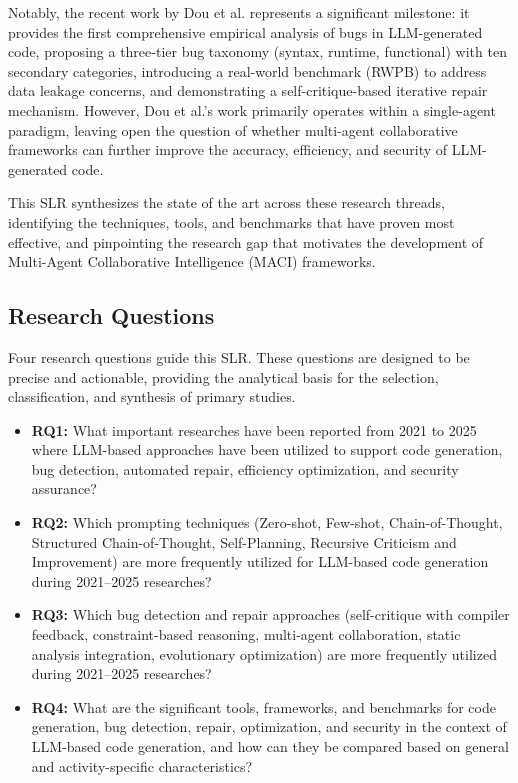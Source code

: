 \documentclass[11pt,a4paper]{article}
\begin{document}
Notably, the recent work by Dou et al. \cite{dou2026} represents a significant milestone: it provides the first comprehensive empirical analysis of bugs in LLM-generated code, proposing a three-tier bug taxonomy (syntax, runtime, functional) with ten secondary categories, introducing a real-world benchmark (RWPB) to address data leakage concerns, and demonstrating a self-critique-based iterative repair mechanism. However, Dou et al.'s work primarily operates within a single-agent paradigm, leaving open the question of whether multi-agent collaborative frameworks can further improve the accuracy, efficiency, and security of LLM-generated code.

This SLR synthesizes the state of the art across these research threads, identifying the techniques, tools, and benchmarks that have proven most effective, and pinpointing the research gap that motivates the development of Multi-Agent Collaborative Intelligence (MACI) frameworks.

\subsection{Research Questions}
\label{sec:research_questions}

Four research questions guide this SLR. These questions are designed to be precise and actionable, providing the analytical basis for the selection, classification, and synthesis of primary studies.

\begin{itemize}[leftmargin=*]
\item \textbf{RQ1:} What important researches have been reported from 2021 to 2025 where LLM-based approaches have been utilized to support code generation, bug detection, automated repair, efficiency optimization, and security assurance?

\item \textbf{RQ2:} Which prompting techniques (Zero-shot, Few-shot, Chain-of-Thought, Structured Chain-of-Thought, Self-Planning, Recursive Criticism and Improvement) are more frequently utilized for LLM-based code generation during 2021--2025 researches?

\item \textbf{RQ3:} Which bug detection and repair approaches (self-critique with compiler feedback, constraint-based reasoning, multi-agent collaboration, static analysis integration, evolutionary optimization) are more frequently utilized during 2021--2025 researches?

\item \textbf{RQ4:} What are the significant tools, frameworks, and benchmarks for code generation, bug detection, repair, optimization, and security in the context of LLM-based code generation, and how can they be compared based on general and activity-specific characteristics?
\end{itemize}
\end{document}
